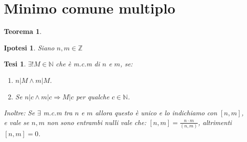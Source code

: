 \documentclass{article}
\newtheorem{theorem}{Teorema}[part]
\newtheorem{ipothesis}[lemma]{Ipotesi}
\newtheorem{thesis}[lemma]{Tesi}
\begin{document}
\section{Minimo comune multiplo}
\begin{theorem}
\end{theorem}
    \begin{ipothesis}
        Siano \(n,m\in\mathbb{Z}\)
    \end{ipothesis}
    \begin{thesis}
        \(\exists!M\in\mathbb{N}\) che è m.c.m di \(n\) e \(m\), se:
        \begin{enumerate}
            \item \(n|M\land m|M\).
            \item Se \(n|c \land m|c \Rightarrow M|c\) per qualche \(c\in\mathbb{N}\). 
        \end{enumerate}
        Inoltre: Se \(\exists\) m.c.m tra \(n\) e \(m\) allora questo è unico e lo indichiamo con \([n,m]\), e vale se \(n,m\) non sono entrambi nulli vale che: \([n,m]=\frac{n\cdot m}{(n,m)}\), altrimenti \([n,m]=0\).
    \end{thesis}
\end{document}
